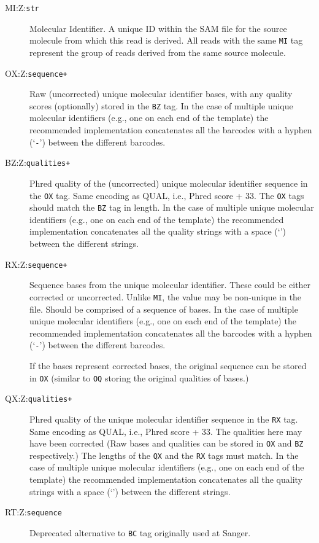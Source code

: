 \documentclass[10pt]{article}
\newcommand{\tagvalue}[1]{\tt #1}
\begin{document}
\begin{description}
\item[MI:Z:\tagvalue{str}]
Molecular Identifier. 
A unique ID within the SAM file for the source molecule from which this read is derived. 
All reads with the same {\tt MI} tag represent the group of reads derived from the same source molecule. 

\item[OX:Z:\tagvalue{sequence+}] 
Raw (uncorrected) unique molecular identifier bases, with any quality scores (optionally) stored in the {\tt BZ} tag. 
In the case of multiple unique molecular identifiers (e.g., one on each end of the template) the recommended implementation concatenates all the barcodes with a hyphen (`{\tt -}') between the different barcodes.
  
\item[BZ:Z:\tagvalue{qualities+}] 
Phred quality of the (uncorrected) unique molecular identifier sequence in the {\tt OX} tag.
Same encoding as {\sf QUAL}, i.e., Phred score + 33.
The {\tt OX} tags should match the {\tt BZ} tag in length. 
In the case of multiple unique molecular identifiers (e.g., one on each end of the template) the recommended implementation concatenates all the quality strings with a space (`{\tt \textvisiblespace}') between the different strings.

\item[RX:Z:\tagvalue{sequence+}]
Sequence bases from the unique molecular identifier. 
These could be either corrected or uncorrected. Unlike {\tt MI}, the value may be non-unique in the file. 
Should be comprised of a sequence of bases. 
In the case of multiple unique molecular identifiers (e.g., one on each end of the template) the recommended implementation concatenates all the barcodes with a hyphen (`{\tt -}') between the different barcodes.

If the bases represent corrected bases, the original sequence can be stored in {\tt OX} (similar to {\tt OQ} storing the original qualities of bases.)

\item[QX:Z:\tagvalue{qualities+}] 
Phred quality of the unique molecular identifier sequence in the {\tt RX} tag. 
Same encoding as {\sf QUAL}, i.e., Phred score + 33.
The qualities here may have been corrected (Raw bases and qualities can be stored in {\tt OX} and {\tt BZ} respectively.)
The lengths of the {\tt QX} and the {\tt RX} tags must match. 
In the case of multiple unique molecular identifiers (e.g., one on each end of the template) the recommended implementation concatenates all the quality strings with a space (`{\tt \textvisiblespace}') between the different strings.

\item[RT:Z:\tagvalue{sequence}]
Deprecated alternative to {\tt BC} tag originally used at Sanger.

\end{description}
\end{document}
